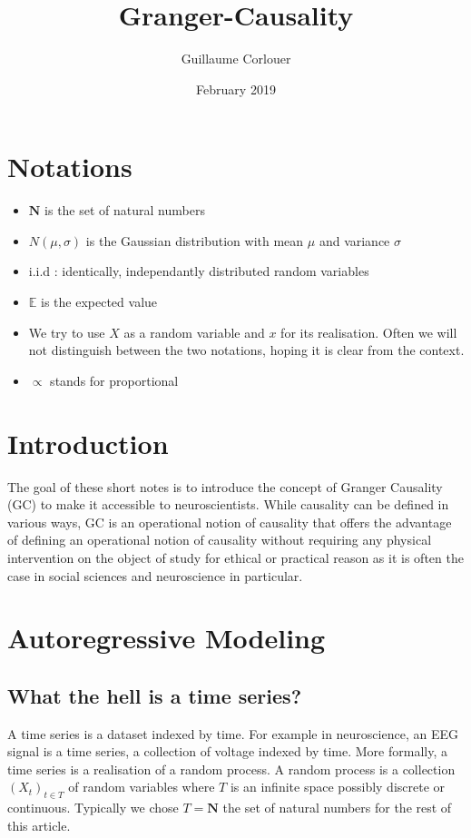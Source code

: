\documentclass{article}
\title{Granger-Causality}
\author{Guillaume Corlouer}
\date{February 2019}
\theoremstyle{definition}
\begin{document}
\maketitle
\tableofcontents
\section{Notations}
\begin{itemize}
    \item $\mathbf{N}$ is the set of natural numbers
    \item $N(\mu,\sigma)$ is the Gaussian distribution with mean $\mu$ and variance $\sigma$
    \item i.i.d : identically, independantly distributed random variables
    \item $\mathds{E}$ is the expected value
    \item We try to use $X$ as a random variable and $x$ for its realisation. Often we will not distinguish between the two notations, hoping it is clear from the context.
    \item $\propto$ stands for proportional
\end{itemize}
\section{Introduction}
The goal of these short notes is to introduce the concept of Granger Causality (GC) to make it accessible to neuroscientists. While causality can be defined in various ways, GC is an operational notion of causality that offers the advantage of defining an operational notion of causality without requiring any physical intervention on the object of study for ethical or practical reason as it is often the case in social sciences and neuroscience in particular.  
\section{Autoregressive Modeling}
\subsection{What the hell is a time series?}
A time series is a dataset indexed by time. For example in neuroscience, an EEG signal is a time series, a collection of voltage indexed by time. More formally, a time series is a realisation of a random process. A random process is a collection $(X_t)_{t\in T}$ of random variables where $T$ is an infinite space possibly discrete or continuous. Typically we chose $T=\mathbf{N}$ the set of natural numbers for the rest of this article. 
\end{document}
